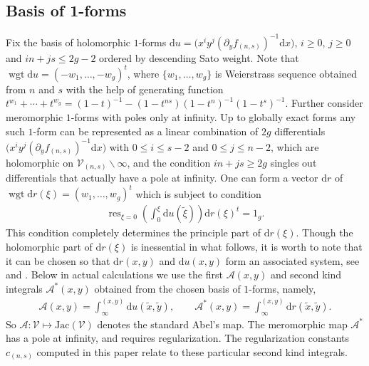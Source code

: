 \documentclass[11pt]{article}
\numberwithin{equation}{section}
\DeclareMathOperator{\res}{res}
\DeclareMathOperator{\wgt}{wgt}
\newcommand{\rmd}{\mathrm{d}}
\newcommand{\Jac}{\mathrm{Jac}}
\begin{document}
\subsection{Basis of 1-forms}\label{ss:CoHomolBasis}
Fix the basis of holomorphic $1$-forms $\rmd u = \big(x^i y^j (\partial_y f_{(n,s)})^{-1}\rmd x\big)$, $i\geqslant 0$, $j\geqslant 0$ and $i n+j s\leqslant 2g-2$ ordered by descending Sato weight. Note that $\wgt \rmd u = ({-}w_1,\dots,{-}w_g)^t$, where $\{w_1,\dots,w_g\}$ is Weierstrass sequence obtained from $n$ and $s$ with the help of generating function $t^{w_1}+\cdots +t^{w_g}= (1-t)^{-1}- (1-t^{ns}) (1-t^n)^{-1}(1-t^s)^{-1}$. Further consider meromorphic $1$-forms with poles only at infinity. Up to globally exact forms any such $1$-form can be represented as a linear combination of $2g$ differentials $\big(x^i y^j (\partial_y f_{(n,s)})^{-1} \rmd x\big)$ with $0\leqslant i \leqslant s-2$ and $0\leqslant j \leqslant n-2$, which are holomorphic on $\mathcal{V}_{(n,s)}\backslash \infty$, and the condition $i n+j s\geqslant 2g$ singles out differentials that actually have a pole at infinity. One can form a vector $\rmd r$ of $\wgt \rmd r(\xi) = (w_1,\dots,w_g)^t$ which is subject to condition
\begin{gather}\label{DiffAjst}
\res_{\xi=0} \left(\int_0^{\xi} \rmd u(\tilde{\xi})\right) \rmd r(\xi)^t = 1_g.
\end{gather}
This condition completely determines the {principle part of $\rmd r(\xi)$.} Though the holomorphic part of $\rmd r(\xi)$ is inessential in what follows, it is {worth} to note that it can be chosen so that $\rmd r(x,y)$ and $\rmd u(x,y)$ form an associated system, see \cite[Section~138]{BakerAF} and \cite[p.~131]{EEL2000}. Below in actual calculations we use the {first $\mathcal{A}(x,y)$ and second kind integrals $\mathcal{A}^\ast(x,y)$ obtained from the chosen basis of $1$-forms}, namely,
\begin{gather*}\mathcal{A}(x,y) = \int_{\infty}^{(x,y)} \rmd u(\tilde{x},\tilde{y}),\qquad \mathcal{A}^\ast(x,y) = \int_{\infty}^{(x,y)} \rmd r(\tilde{x},\tilde{y}).\end{gather*}
So $\mathcal{A}\colon \mathcal{V} \mapsto \Jac(\mathcal{V})$ denotes the standard Abel's map. The meromorphic map $\mathcal{A}^\ast$ has a pole at infinity, and requires regularization. The regularization constants~$c_{(n,s)}$ computed in this paper relate to these particular second kind integrals.
\end{document}
